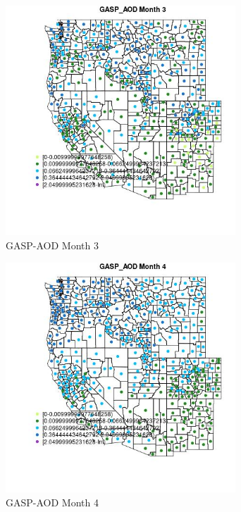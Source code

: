 \begin{figure} 
\centering  
\includegraphics[width=0.77\textwidth]{Code_Outputs/df_report_ML_predictors_CountyCentroid_Locations_Dates_2008-01-01to2018-12-31_MapObsMo3GASP_AOD.jpg} 
\caption{\label{fig:df_report_ML_predictors_CountyCentroid_Locations_Dates_2008-01-01to2018-12-31MapObsMo3GASP_AOD}GASP-AOD Month 3} 
\end{figure} 
 

\begin{figure} 
\centering  
\includegraphics[width=0.77\textwidth]{Code_Outputs/df_report_ML_predictors_CountyCentroid_Locations_Dates_2008-01-01to2018-12-31_MapObsMo4GASP_AOD.jpg} 
\caption{\label{fig:df_report_ML_predictors_CountyCentroid_Locations_Dates_2008-01-01to2018-12-31MapObsMo4GASP_AOD}GASP-AOD Month 4} 
\end{figure} 
 

